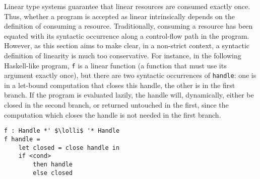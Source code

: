 \documentclass[acmsmall,review,screen]{acmart}
\newcommand{\lolli}{\multimap}
\newcommand{\ROUNDTWO}[1]{{\color{red}#1}}
\begin{document}
Linear type systems guarantee that linear resources are consumed exactly once.
\ROUNDTWO{Thus}, whether a program is \ROUNDTWO{accepted as linear} intrinsically depends on
the definition of consuming a resource.
%
\ROUNDTWO{Traditionally}, consuming a resource \ROUNDTWO{has been} equated with its 
syntactic occurrence along a control-flow path in the program. However, as this
section \ROUNDTWO{aims to} make clear, \ROUNDTWO{in a non-strict context, a
syntactic definition of linearity is much too conservative}.
%
For instance, in the following Haskell-like program, \lstinline{f} is a linear
function (a function that must use its argument
exactly once), but there are two syntactic
occurrences of \lstinline{handle}: one is in a let-bound computation that
closes this handle, the other \ROUNDTWO{is in the first branch}. If the program is
evaluated lazily, the handle will, \ROUNDTWO{dynamically, either be closed in
the second branch, or returned untouched in the first}, since the computation
which closes the handle is \ROUNDTWO{not needed in the first branch}.
%
\begin{lstlisting}
f : Handle *' $\lolli$ '* Handle
f handle =
    let closed = close handle in
    if <cond>
        then handle
        else closed
\end{lstlisting}
%
%
%
%
%
%
%
%
%
%
\end{document}
